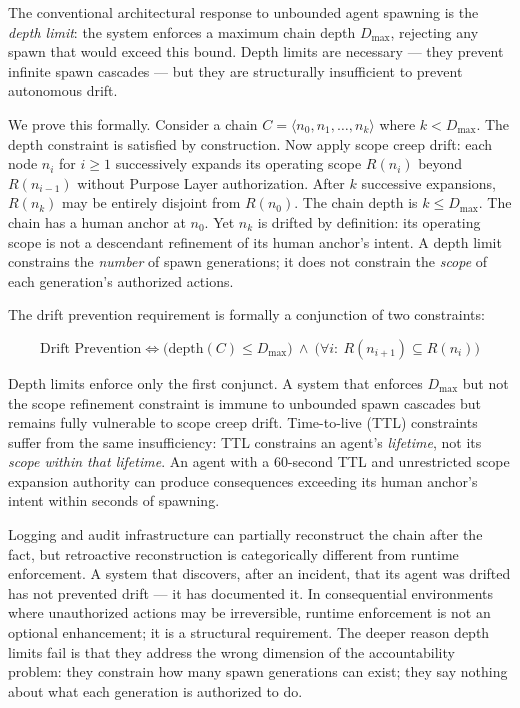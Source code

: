 \documentclass[12pt]{article}
\begin{document}
The conventional architectural response to unbounded agent spawning is the \emph{depth limit}: the system enforces a maximum chain depth $D_{\max}$, rejecting any spawn that would exceed this bound. Depth limits are necessary --- they prevent infinite spawn cascades --- but they are structurally insufficient to prevent autonomous drift.

We prove this formally. Consider a chain $C = \langle n_0, n_1, \ldots, n_k \rangle$ where $k < D_{\max}$. The depth constraint is satisfied by construction. Now apply scope creep drift: each node $n_i$ for $i \geq 1$ successively expands its operating scope $R(n_i)$ beyond $R(n_{i-1})$ without Purpose Layer authorization. After $k$ successive expansions, $R(n_k)$ may be entirely disjoint from $R(n_0)$. The chain depth is $k \leq D_{\max}$. The chain has a human anchor at $n_0$. Yet $n_k$ is drifted by definition: its operating scope is not a descendant refinement of its human anchor's intent. A depth limit constrains the \emph{number} of spawn generations; it does not constrain the \emph{scope} of each generation's authorized actions.

The drift prevention requirement is formally a conjunction of two constraints:

\begin{equation}
\text{Drift Prevention} \iff \bigl(\text{depth}(C) \leq D_{\max}\bigr) \ \land \ \bigl(\forall i:\ R(n_{i+1}) \subseteq R(n_i)\bigr)
\label{eq:intro-drift-prevention}
\end{equation}

Depth limits enforce only the first conjunct. A system that enforces $D_{\max}$ but not the scope refinement constraint is immune to unbounded spawn cascades but remains fully vulnerable to scope creep drift. Time-to-live (TTL) constraints suffer from the same insufficiency: TTL constrains an agent's \emph{lifetime}, not its \emph{scope within that lifetime}. An agent with a 60-second TTL and unrestricted scope expansion authority can produce consequences exceeding its human anchor's intent within seconds of spawning.

Logging and audit infrastructure can partially reconstruct the chain after the fact, but retroactive reconstruction is categorically different from runtime enforcement. A system that discovers, after an incident, that its agent was drifted has not prevented drift --- it has documented it. In consequential environments where unauthorized actions may be irreversible, runtime enforcement is not an optional enhancement; it is a structural requirement. The deeper reason depth limits fail is that they address the wrong dimension of the accountability problem: they constrain how many spawn generations can exist; they say nothing about what each generation is authorized to do.
\end{document}
